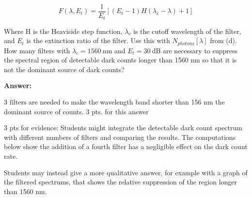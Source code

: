\documentclass[12pt]{caltech_thesis}
\begin{document}
\begin{enumerate}
  \[F(\lambda, E_t) = \frac{1}{E_t}[(E_t - 1)H(\lambda_c - \lambda) + 1]\]

  Where H is the Heaviside step function, \(\lambda_c\) is the cutoff
  wavelength of the filter, and \(E_t\) is the extinction ratio of the
  filter. Use this with \(N_{photons}[\lambda]\) from (d). How many
  filters with \(\lambda_c = 1560~\text{nm}\) and \(E_t = 30~\text{dB}\)
  are necessary to suppress the spectral region of detectable dark
  counts longer than 1560 nm so that it is not the dominant source of
  dark counts?

  {\color{midnightblue}  \textbf{Answer:} }

  {\color{midnightblue} \(\boxed{\text{3 filters}}\) are needed to make
  the wavelength band shorter than 156 nm the dominant source of
  counts.} {\color{darkred} 3 pts. for this answer}

  {\color{darkred} 3 pts for evidence:} {\color{midnightblue} Students
  might integrate the detectable dark count spectrum with different
  numbers of filters and comparing the results. The computations below
  show the addition of a fourth filter has a negligible effect on the
  dark count rate. }

  {\color{midnightblue} Students may instead give a more qualitative
  answer, for example with a graph of the filtered spectrums, that shows
  the relative suppression of the region longer than 1560 nm. }


\end{enumerate}
\end{document}
